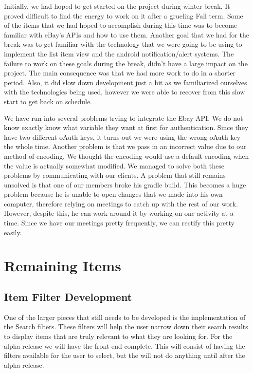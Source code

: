 \documentclass[journal,compsoc, 10pt, draftclsnofoot, onecolumn]{IEEEtran}
\begin{document}
Initially, we had hoped to get started on the project during winter break. 
It proved difficult to find the energy to work on it after a grueling Fall 
term. Some of the items that we had hoped to accomplish during this time was 
to become familiar with eBay's APIs and how to use them. Another goal that we 
had for the break was to get familiar with the technology that we were going 
to be using to implement the list item view and the android notification/alert 
systems. The failure to work on these goals during the break, didn't have a 
large impact on the project. The main consequence was that we had more work to 
do in a shorter period. Also, it did slow down development just a bit as we 
familiarized ourselves with the technologies being used, however we were able 
to recover from this slow start to get back on schedule.

We have run into several problems trying to integrate the Ebay API. We do not know exactly know what variable they want at first for authentication. Since they have two different oAuth keys, it turns out we were using the wrong oAuth key the whole time. Another problem is that we pass in an incorrect value due to our method of encoding. We thought the encoding would use a default encoding when the value is actually somewhat modified. We managed to solve both these problems by communicating with our clients. 
A problem that still remains unsolved is that one of our members broke his gradle build. This becomes a huge problem because he is unable to open changes that we made into his own computer, therefore relying on meetings to catch up with the rest of our work. However, despite this, he can work around it by working on one activity at a time. Since we have our meetings pretty frequently, we can rectify this pretty easily.


\section{Remaining Items}

\subsection{Item Filter Development}
One of the larger pieces that still needs to be developed is the implementation
 of the Search filters. These filters will help the user narrow down their 
search results to display items that are truly relevant to what they are 
looking for. For the alpha release we will have the front end complete. This 
will consist of having the filters available for the user to select, but the 
will not do anything until after the alpha release. 
\end{document}

